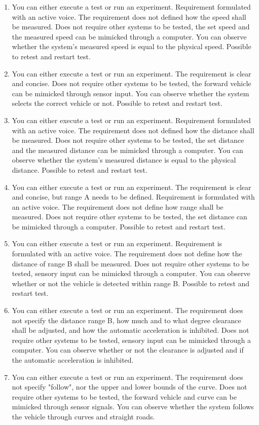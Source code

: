 \begin{enumerate}
    \item You can either execute a test or run an experiment. Requirement formulated with an active voice. The requirement does not defined how the speed shall be measured. Does not require other systems to be tested, the set speed and the measured speed can be mimicked through a computer. You can observe whether the system's measured speed is equal to the physical speed. Possible to retest and restart test.
    \item You can either execute a test or run an experiment. The requirement is clear and concise. Does not require other systems to be tested, the forward vehicle can be mimicked through sensor input. You can observe whether the system selects the correct vehicle or not. Possible to retest and restart test. 
    \item You can either execute a test or run an experiment. Requirement formulated with an active voice. The requirement does not defined how the distance shall be measured. Does not require other systems to be tested, the set distance and the measured distance can be mimicked through a computer. You can observe whether the system's measured distance is equal to the physical distance. Possible to retest and restart test.
    \item You can either execute a test or run an experiment. The requirement is clear and concise, but range A needs to be defined. Requirement is formulated with an active voice. The requirement does not define how range shall be measured. Does not require other systems to be tested, the set distance can be mimicked through a computer. Possible to retest and restart test. 
    \item You can either execute a test or run an experiment. Requirement is formulated with an active voice. The requirement does not define how the distance of range B shall be measured. Does not require other systems to be tested, sensory input can be mimicked through a computer. You can observe whether or not the vehicle is detected within range B. Possible to retest and restart test.
    \item You can either execute a test or run an experiment. The requirement does not specify the distance range B, how much and to what degree clearance shall be adjusted, and how the automatic acceleration is inhibited. Does not require other systems to be tested, sensory input can be mimicked through a computer. You can observe whether or not the clearance is adjusted and if the automatic acceleration is inhibited. 
    \item You can either execute a test or run an experiment. The requirement does not specify "follow", nor the upper and lower bounds of the curve. Does not require other systems to be tested, the forward vehicle and curve can be mimicked through sensor signals. You can observe whether the system follows the vehicle through curves and straight roads. 
\end{enumerate}

